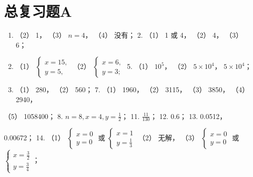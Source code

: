 \section{总复习题A}

\begin{enumerate}
\item
  （2） 1， （3） \(n = 4\)， （4） 没有； 2. （1） 1 或 4， （2） 4，
  （3） 6；
\item
  （1）
  \(\left\{ \begin{array}{l} x = 15, \\ y = 5, \end{array} \right.\)
  （2）
  \(\left\{ \begin{array}{l} x = 6, \\ y = 3; \end{array} \right.\) 5.
  （1） \(10^{5}\)， （2） \(5 \times 10^{4}\)， \(5 \times 10^{4}\)；
\item
  （1） 280， （2） 560； 7. （1） 1960， （2） 3115， （3） 3850，
  （4） 2940，
\end{enumerate}

（5） 1058400； 8. \(n = 8, x = 4, y = \frac{1}{2}\)； 11.
\(\frac{11}{130}\)； 12. 0.6； 13. 0.0512，

0.00672； 14. （1）
\(\left\{ \begin{array}{l} x = 0 \\ y = 0 \end{array} \right.\) 或
\(\left\{ \begin{array}{l} x = 1 \\ y = \frac{1}{3} \end{array} \right.\)
（2） 无解， （3）
\(\left\{ \begin{array}{l} x = 0 \\ y = 0 \end{array} \right.\) 或
\(\left\{ \begin{array}{l} x = \frac{3}{2} \\ y = \frac{3}{4} \end{array} \right.\)；

